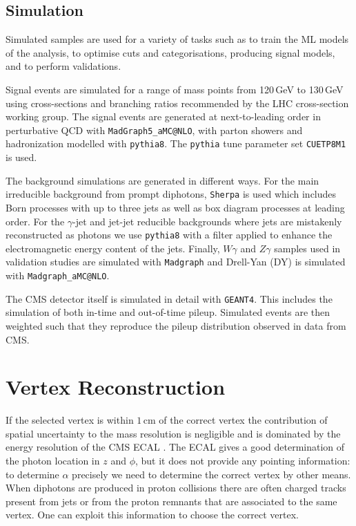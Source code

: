 \subsection{Simulation}

Simulated samples are used for a variety of tasks such as to train the ML models of the analysis, to optimise cuts and categorisations, producing signal models, and to perform validations. 

Signal events are simulated for a range of mass points from 120\,GeV to 130\,GeV using cross-sections and branching ratios recommended by the LHC cross-section working group. 
The signal events are generated at next-to-leading order in perturbative QCD with \texttt{MadGraph5_{}aMC@NLO}, with  parton showers and hadronization modelled with \texttt{pythia8}. The \texttt{pythia} tune parameter set \texttt{CUETP8M1} is used.

The background simulations are generated in different ways. For the main irreducible background from prompt diphotons, \texttt{Sherpa} is used which includes Born processes with up to three jets as well as box diagram processes at leading order. 
For the $\gamma$-jet and jet-jet reducible backgrounds where jets are mistakenly reconstructed as photons we use \texttt{pythia8} with a filter applied to enhance the electromagnetic energy content of the jets. 
Finally, $W\gamma$ and $Z\gamma$ samples used in validation studies are simulated with \texttt{Madgraph} and Drell-Yan (DY) is simulated with \texttt{Madgraph_{}aMC@NLO}.


The CMS detector itself is simulated in detail with \texttt{GEANT4}. 
This includes the simulation of both in-time and out-of-time pileup. 
Simulated events are then weighted such that they reproduce the pileup distribution observed in data from CMS.






\section{Vertex Reconstruction}
If the selected vertex is within $1$\,cm of the correct vertex the contribution of spatial uncertainty to the mass resolution is negligible and is dominated by the energy resolution of the CMS ECAL \cite{HIG-16-040}. 
The ECAL gives a good determination of the photon location in $z$ and $\phi$, but it does not provide any pointing information: to determine $\alpha$ precisely we need to determine the correct vertex by other means.
When diphotons are produced in proton collisions there are often charged tracks present from jets or from the proton remnants that are associated to the same vertex. One can exploit this information to choose the correct vertex.  


